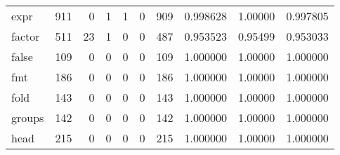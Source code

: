 \begin{tabular}{lrrrrrrrrr}
expr      &                    911 &                                  0 &                                 1 &                                1 &                                 0 &                             909 &                                0.998628 &                                1.00000 &                             0.997805 \\
factor    &                    511 &                                 23 &                                 1 &                                0 &                                 0 &                             487 &                                0.953523 &                                0.95499 &                             0.953033 \\
false     &                    109 &                                  0 &                                 0 &                                0 &                                 0 &                             109 &                                1.000000 &                                1.00000 &                             1.000000 \\
fmt       &                    186 &                                  0 &                                 0 &                                0 &                                 0 &                             186 &                                1.000000 &                                1.00000 &                             1.000000 \\
fold      &                    143 &                                  0 &                                 0 &                                0 &                                 0 &                             143 &                                1.000000 &                                1.00000 &                             1.000000 \\
groups    &                    142 &                                  0 &                                 0 &                                0 &                                 0 &                             142 &                                1.000000 &                                1.00000 &                             1.000000 \\
head      &                    215 &                                  0 &                                 0 &                                0 &                                 0 &                             215 &                                1.000000 &                                1.00000 &                             1.000000 \\

\end{tabular}
